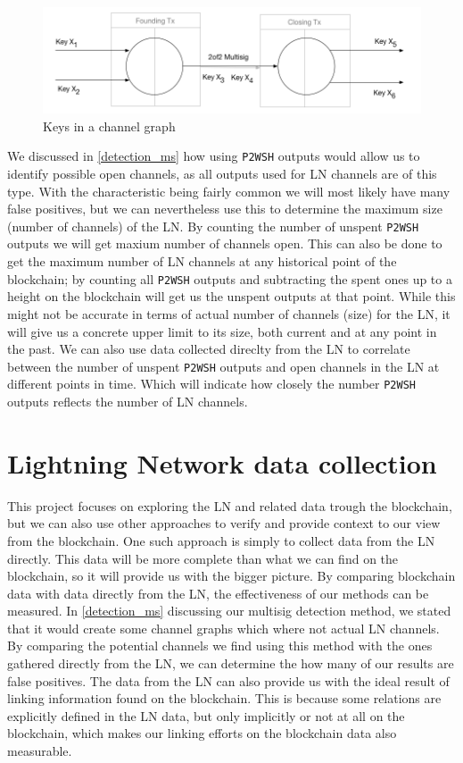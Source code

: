 \begin{figure}[h]
    \centering
    \includegraphics[width=14cm]{figures/keys_subgraph.png}
    \caption{Keys in a channel graph}
    \label{fig:keys_graphs}
\end{figure}

We discussed in \cref{detection_ms} how using {\tt P2WSH} outputs would allow us to identify possible open channels, as all outputs used for LN channels are of this type. With the characteristic being fairly common we will most likely have many false positives, but we can nevertheless use this to determine the maximum size (number of channels) of the LN.
By counting the number of unspent {\tt P2WSH} outputs we will get maxium number of channels open. This can also be done to get the maximum number of LN channels at any historical point of the blockchain;
by counting all {\tt P2WSH} outputs and subtracting the spent ones up to a height on the blockchain will get us the unspent outputs at that point.
While this might not be accurate in terms of actual number of channels (size) for the LN, it will give us a concrete upper limit to its size, both current and at any point in the past.
We can also use data collected direclty from the LN to correlate between the number of unspent {\tt P2WSH} outputs and open channels in the LN at different points in time. Which will indicate how closely the number {\tt P2WSH} outputs reflects the number of LN channels.

\section{Lightning Network data collection}
\label{sec:ln_analysis}

This project focuses on exploring the LN and related data trough the blockchain, but we can also use other approaches to verify and provide context to our view from the blockchain.
One such approach is simply to collect data from the LN directly.
This data will be more complete than what we can find on the blockchain, so it will provide us with the bigger picture. By comparing blockchain data with data directly from the LN, the effectiveness of our methods can be measured. In \cref{detection_ms} discussing our multisig detection method, we stated that it would create some channel graphs which where not actual LN channels. By comparing the potential channels we find using this method with the ones gathered directly from the LN, we can determine the how many of our results are false positives.
The data from the LN can also provide us with the ideal result of linking information found on the blockchain. This is because some relations are explicitly defined in the LN data, but only implicitly or not at all on the blockchain, which makes our linking efforts on the blockchain data also measurable.
\\

